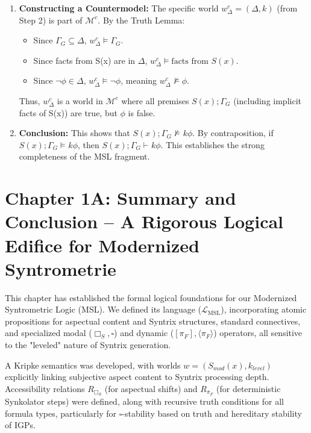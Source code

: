\documentclass[
    12pt,              %
    a4paper,           %
    headings=normal,   %
    twoside=true,      %
    BCOR=8mm,          %
]{scrbook}
\newcommand{\Smodx}{S_{mod}(x)}
\newcommand{\LMSL}{\mathcal{L}_{\text{MSL}}}
\newcommand{\BoxS}{\Box_S}
\newcommand{\BoxSyn}{\square}
\newcommand{\dynboxgen}[1]{[#1]}
\newcommand{\dyndiamondgen}[1]{\langle#1\rangle}
\newcommand{\turnstilek}[1][]{\vdash^{#1}}
\newcommand{\modelsk}[1][]{\vDash^{#1}}
\begin{document}
\begin{myproof}
\begin{enumerate}[label=\arabic*.]
\begin{itemize}
        \end{itemize}
    \item  \textbf{Constructing a Countermodel:} The specific world \(w^c_{\Delta} = (\Delta, k)\) (from Step 2) is part of \(\mathcal{M}^c\). By the Truth Lemma:
        \begin{itemize}
            \item   Since \(\Gamma_G \subseteq \Delta\), \(w^c_{\Delta} \vDash \Gamma_G\).
            \item   Since facts from S(x) are in \(\Delta\), \(w^c_{\Delta} \vDash \text{facts from } S(x)\).
            \item   Since \(\neg\phi \in \Delta\), \(w^c_{\Delta} \vDash \neg\phi\), meaning \(w^c_{\Delta} \nvDash \phi\).
        \end{itemize}
        Thus, \(w^c_{\Delta}\) is a world in \(\mathcal{M}^c\) where all premises \(S(x); \Gamma_G\) (including implicit facts of S(x)) are true, but \(\phi\) is false.
    \item  \textbf{Conclusion:} This shows that \(S(x); \Gamma_G \not\modelsk{k} \phi\). By contraposition, if \(S(x); \Gamma_G \modelsk{k} \phi\), then \(S(x); \Gamma_G \turnstilek{k} \phi\). This establishes the strong completeness of the MSL fragment.
\end{enumerate}
\end{myproof}

\section*{Chapter 1A: Summary and Conclusion – A Rigorous Logical Edifice for Modernized Syntrometrie}

This chapter has established the formal logical foundations for our Modernized Syntrometric Logic (MSL). We defined its language (\(\LMSL\)), incorporating atomic propositions for aspectual content and Syntrix structures, standard connectives, and specialized modal (\(\BoxS, \BoxSyn\)) and dynamic (\(\dynboxgen{\pi_F}, \dyndiamondgen{\pi_F}\)) operators, all sensitive to the "leveled" nature of Syntrix generation.

A Kripke semantics was developed, with worlds \(w = (\Smodx, k_{level})\) explicitly linking subjective aspect content to Syntrix processing depth. Accessibility relations \(R_{\BoxS}\) (for aspectual shifts) and \(R_{\pi_F}\) (for deterministic Synkolator steps) were defined, along with recursive truth conditions for all formula types, particularly for \(\BoxSyn\)-stability based on truth and hereditary stability of IGPs.
\end{document}
